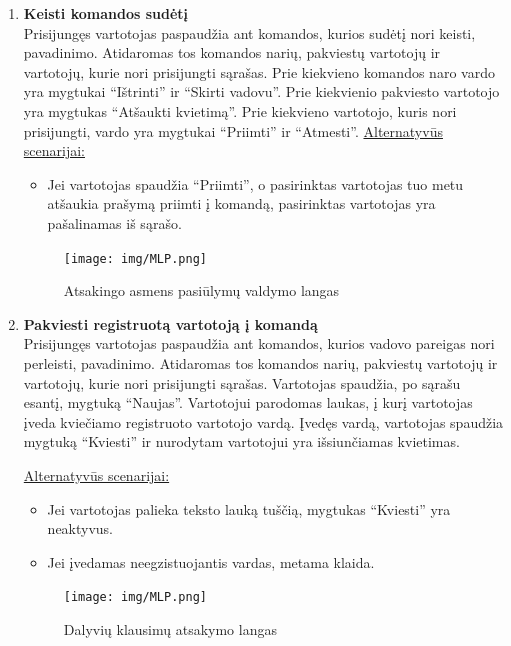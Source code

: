 \documentclass{VUMIFPSkursinis}
\begin{document}
\begin{enumerate} [label = \textbf{U\arabic*.}]
			\item \textbf{Keisti komandos sudėtį} \\
				Prisijungęs vartotojas paspaudžia ant komandos, kurios sudėtį nori keisti, pavadinimo. Atidaromas tos komandos narių, pakviestų vartotojų ir vartotojų, kurie nori prisijungti sąrašas. Prie kiekvieno komandos naro vardo yra mygtukai “Ištrinti” ir “Skirti vadovu”. Prie kiekvienio pakviesto vartotojo yra mygtukas “Atšaukti kvietimą”. Prie kiekvieno vartotojo, kuris nori prisijungti, vardo yra mygtukai “Priimti” ir “Atmesti”. 
				\underline{Alternatyvūs scenarijai:}
				\begin{itemize}
					\item Jei vartotojas spaudžia “Priimti”, o pasirinktas vartotojas tuo metu atšaukia prašymą priimti į komandą, pasirinktas vartotojas yra pašalinamas iš sąrašo.
				\end{itemize}
				
				\begin{figure}[H]
					\centering
					\texttt{[image: img/MLP.png]}
					\caption{Atsakingo asmens pasiūlymų valdymo langas}
					\label{fig:pasiulymu-sarasas}
				\end{figure}
				
			\item \textbf{Pakviesti registruotą vartotoją į komandą}   \\
					Prisijungęs vartotojas paspaudžia ant komandos, kurios vadovo pareigas nori perleisti, pavadinimo. Atidaromas tos komandos narių, pakviestų vartotojų ir vartotojų, kurie nori prisijungti sąrašas.  
					Vartotojas spaudžia, po sąrašu esantį, mygtuką “Naujas”. Vartotojui parodomas laukas, į kurį vartotojas įveda kviečiamo registruoto vartotojo vardą. Įvedęs vardą, vartotojas spaudžia mygtuką “Kviesti” ir nurodytam vartotojui yra išsiunčiamas kvietimas.
					
					\underline{Alternatyvūs scenarijai:}
					\begin{itemize}
						\item Jei vartotojas palieka teksto lauką tuščią, mygtukas “Kviesti” yra neaktyvus.
						\item Jei įvedamas neegzistuojantis vardas, metama klaida.
					\end{itemize}
				
				\begin{figure}[H]
					\centering
					\texttt{[image: img/MLP.png]}
					\caption{Dalyvių klausimų atsakymo langas}
					\label{fig:atsakyti-klausimus}
				\end{figure}
				

\end{enumerate}
\end{document}
